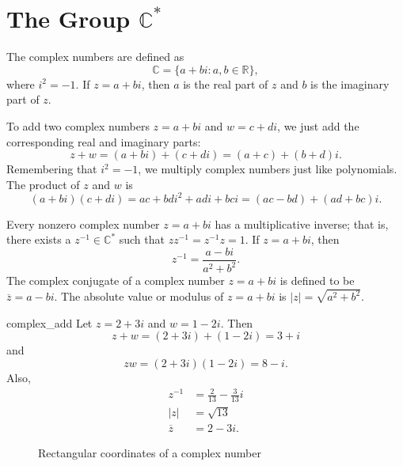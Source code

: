  
\section{The Group ${\mathbb C}^\ast$}
 
 
The {\bfi complex numbers} are defined as
\[
{\mathbb C} = \{ a + bi : a, b \in {\mathbb R} \},
\]
where $i^2 = -1$.  If $z=a+bi$, then $a$ is the {\bfi real part} of $z$
and $b$ is the {\bfi imaginary part} of $z$. 
 
 
To add two complex numbers $z=a+bi$ and $w= c+di$, we just
add the corresponding real and imaginary parts:
\[
z+w=(a + bi ) + (c + di)  =  (a+c) + (b+d)i.
\]
Remembering that $i^2 = -1$,  we multiply complex numbers just like
polynomials. The product of $z$ and $w$ is 
\[
(a + bi )(c + di)  =   ac + bdi^2 + adi + bci =  (ac -bd) +
(ad + bc)i.
\]
 
 
Every nonzero complex number $z = a +bi$ has a multiplicative inverse;
that is, there exists a $z^{-1} \in {\mathbb C}^\ast$ such that $z z^{-1}
= z^{-1} z = 1$. If $z = a + bi$, then 
\[
z^{-1} = \frac{a-bi}{ a^2 + b^2  }.
\]
The {\bfi complex conjugate} of a complex
number $z = a +bi$ is defined to be $\overline{z} = a-bi$.  The {\bfi
absolute value} or {\bfi modulus} of  $z = a +bi$  is $|z| =
\sqrt{a^2+b^2}$.  
 
 
\begin{example}{complex_add}
Let $z = 2 + 3i$ and $w = 1-2i$. Then
\[
z + w = (2 + 3i)+( 1-2i ) = 3 +i
\]
and
\[
z  w = (2 + 3i)( 1-2i ) = 8-i.
\]
Also,
\begin{align*}
z^{-1} & = \frac{2}{13} - \frac{3}{13}i \\
|z| & = \sqrt{13} \\
\overline{z} & = 2-3i.
\end{align*}
\end{example}
 
\begin{figure}[hbt]  %
\begin{center}
\end{center}
\caption{Rectangular coordinates of a complex number}
\label{rectcoord}
\end{figure}
 
